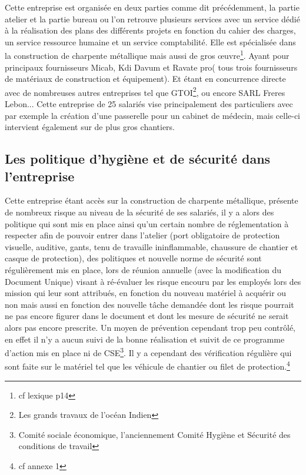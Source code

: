 Cette entreprise est organisée en deux parties comme dit précédemment, la partie atelier et la partie bureau ou l'on retrouve plusieurs services avec un service dédié à la réalisation des plans des différents projets en fonction du cahier des charges, un service ressource humaine et un service comptabilité.\newline
Elle est spécialisée dans la construction de charpente métallique mais aussi de gros œuvre\footnote{cf lexique p14}. Ayant pour principaux fournisseurs Micab, Kdi Davum et Ravate pro( tous trois fournisseurs de matériaux de construction et équipement). Et étant en concurrence directe avec de nombreuses autres entreprises tel que GTOI\footnote{Les grands travaux de l'océan Indien}, ou encore SARL Freres Lebon...\newline
Cette entreprise de 25 salariés vise principalement des particuliers avec par exemple la création d'une passerelle pour un cabinet de médecin, mais celle-ci intervient également sur de plus gros chantiers.



\subsection{Les politique d'hygiène et de sécurité dans l'entreprise}

Cette entreprise étant accès sur la construction de charpente métallique, présente de nombreux risque au niveau de la sécurité de ses salariés, il y a alors des politique qui sont mis en place ainsi qu'un certain nombre de réglementation à respecter afin de pouvoir entrer dans l'atelier (port obligatoire de protection visuelle, auditive, gants, tenu de travaille ininflammable, chaussure de chantier et casque de protection), des politiques et nouvelle norme de sécurité sont régulièrement mis en place, lors de réunion annuelle (avec la modification du Document Unique) visant à ré-évaluer les risque encouru par les employés lors des mission qui leur sont attribués, en fonction du nouveau matériel à acquérir ou non mais aussi en fonction des nouvelle tâche demandée dont les risque pourrait ne pas encore figurer dans le document et dont les mesure de sécurité ne serait alors pas encore prescrite.\newline
Un moyen de prévention cependant trop peu contrôlé, en effet il n'y a aucun suivi de la bonne réalisation et suivit de ce programme d'action mis en place ni de CSE\footnote{Comité sociale économique, l'anciennement Comité Hygiène et Sécurité des conditions de travail}. Il y a cependant des vérification régulière qui sont faite sur le matériel tel que les véhicule de chantier ou filet de protection.\footnote{cf annexe 1}



